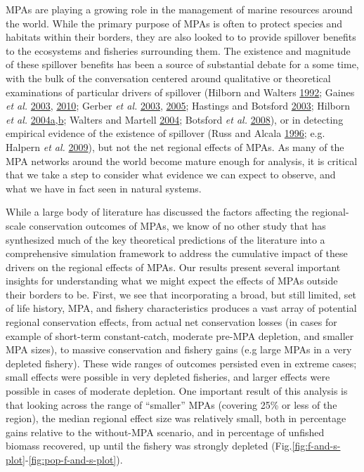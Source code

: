 \documentclass[twoside,12pt,final]{ucthesis-CA2012}
\begin{document}
\begin{ucmainmatter}
MPAs are playing a growing role in the management of marine resources
around the world. While the primary purpose of MPAs is often to protect
species and habitats within their borders, they are also looked to to
provide spillover benefits to the ecosystems and fisheries surrounding
them. The existence and magnitude of these spillover benefits has been a
source of substantial debate for a some time, with the bulk of the
conversation centered around qualitative or theoretical examinations of
particular drivers of spillover (Hilborn and Walters
\protect\hyperlink{ref-Hilborn1992}{1992}; Gaines \emph{et al.}
\protect\hyperlink{ref-Gaines2003}{2003},
\protect\hyperlink{ref-Gaines2010}{2010}; Gerber \emph{et al.}
\protect\hyperlink{ref-Gerber2003}{2003},
\protect\hyperlink{ref-Gerber2005}{2005}; Hastings and Botsford
\protect\hyperlink{ref-Hastings2003}{2003}; Hilborn \emph{et al.}
\protect\hyperlink{ref-Hilborn2004a}{2004}\protect\hyperlink{ref-Hilborn2004a}{a},\protect\hyperlink{ref-Hilborn2004}{b};
Walters and Martell \protect\hyperlink{ref-Walters2004}{2004}; Botsford
\emph{et al.} \protect\hyperlink{ref-Botsford2008}{2008}), or in
detecting empirical evidence of the existence of spillover (Russ and
Alcala \protect\hyperlink{ref-Russ1996}{1996}; e.g. Halpern \emph{et
al.} \protect\hyperlink{ref-Halpern2009}{2009}), but not the net
regional effects of MPAs. As many of the MPA networks around the world
become mature enough for analysis, it is critical that we take a step to
consider what evidence we can expect to observe, and what we have in
fact seen in natural systems.

While a large body of literature has discussed the factors affecting the
regional-scale conservation outcomes of MPAs, we know of no other study
that has synthesized much of the key theoretical predictions of the
literature into a comprehensive simulation framework to address the
cumulative impact of these drivers on the regional effects of MPAs. Our
results present several important insights for understanding what we
might expect the effects of MPAs outside their borders to be. First, we
see that incorporating a broad, but still limited, set of life history,
MPA, and fishery characteristics produces a vast array of potential
regional conservation effects, from actual net conservation losses (in
cases for example of short-term constant-catch, moderate pre-MPA
depletion, and smaller MPA sizes), to massive conservation and fishery
gains (e.g large MPAs in a very depleted fishery). These wide ranges of
outcomes persisted even in extreme cases; small effects were possible in
very depleted fisheries, and larger effects were possible in cases of
moderate depletion. One important result of this analysis is that
looking across the range of ``smaller'' MPAs (covering 25\% or less of
the region), the median regional effect size was relatively small, both
in percentage gains relative to the without-MPA scenario, and in
percentage of unfished biomass recovered, up until the fishery was
strongly depleted
(Fig.\ref{fig:f-and-s-plot}-\ref{fig:pop-f-and-s-plot}).


\end{ucmainmatter}
\end{document}

